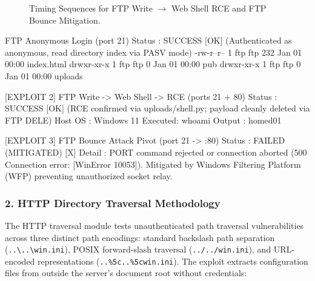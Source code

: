 \begin{figure}[htbp]
\begin{minipage}[t]{0.485\textwidth}
\end{minipage}
\caption{Timing Sequences for FTP Write $\to$ Web Shell RCE and FTP Bounce Mitigation.}
\label{fig:timing_ftp}
\end{figure}

\begin{logbox}
[EXPLOIT 1] FTP Anonymous Login (port 21)
  Status  : SUCCESS [OK]  (Authenticated as anonymous, read directory index via PASV mode)
    -rw-r--r-- 1 ftp ftp 232 Jan 01 00:00 index.html
    drwxr-xr-x 1 ftp ftp   0 Jan 01 00:00 pub
    drwxr-xr-x 1 ftp ftp   0 Jan 01 00:00 uploads

[EXPLOIT 2] FTP Write -> Web Shell -> RCE (ports 21 + 80)
  Status  : SUCCESS [OK]  (RCE confirmed via uploads/shell.py; payload cleanly deleted via FTP DELE)
    Host OS : Windows 11   Executed: whoami
    Output  : homed01\turjo

[EXPLOIT 3] FTP Bounce Attack Pivot (port 21 -> :80)
  Status  : FAILED (MITIGATED) [X]
  Detail  : PORT command rejected or connection aborted (500 Connection error: [WinError 10053]).
            Mitigated by Windows Filtering Platform (WFP) preventing unauthorized socket relay.
\end{logbox}

\subsubsection{2. HTTP Directory Traversal Methodology}
The HTTP traversal module tests unauthenticated path traversal vulnerabilities across three distinct
path encodings: standard backslash path separation (\texttt{..\textbackslash ..\textbackslash win.ini}),
POSIX forward-slash traversal (\texttt{../../win.ini}), and URL-encoded representations
(\texttt{..\%5c..\%5cwin.ini}). The exploit extracts configuration files from outside the server's
document root without credentials:

